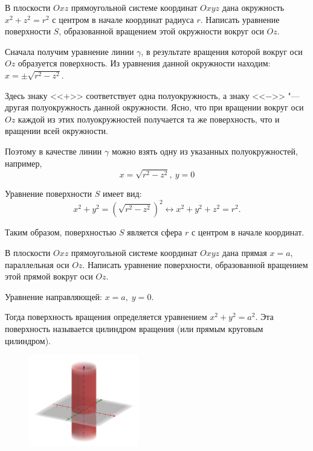 \begin{example}
  В плоскости $Oxz$ прямоугольной системе координат $Oxyz$ дана окружность $x^2 + z^2 = r^2$ с центром в начале координат радиуса $r$. Написать уравнение поверхности $S$, образованной вращением этой окружности вокруг оси $Oz$.

  Сначала получим уравнение линии $\gamma$, в результате вращения которой вокруг оси $Oz$ образуется поверхность. Из уравнения данной окружности находим: $x = \pm \sqrt{r^2 - z^2}$.

  Здесь знаку <<$+$>> соответствует одна полуокружность, а знаку <<$-$>> "--- другая полуокружность данной окружности. Ясно, что при вращении вокруг
  оси $Oz$ каждой из этих полуокружностей получается та же поверхность, что и вращении всей окружности.

  Поэтому в качестве линии $\gamma$ можно взять одну из указанных полуокружностей, например,
  $$
    x = \sqrt{r^2 - z^2},~ y = 0
  $$

  Уравнение поверхности $S$ имеет вид: $$
    x^2 + y^2 = (\sqrt{r^2 - z^2})^2 \leftrightarrow x^2 + y^2 + z^2 = r^2.
  $$

  Таким образом, поверхностью $S$ является сфера $r$ с центром в начале координат.
\end{example}

\begin{example}
  В плоскости $Oxz$ прямоугольной системе координат $Oxyz$ дана прямая $x = a$, параллельная оси $Oz$. Написать уравнение поверхности,
  образованной вращением этой прямой вокруг оси $Oz$.
  
  Уравнение направляющей: $x = a, \; y = 0$.

  Тогда поверхность вращения определяется уравнением $x^2 + y^2 = a^2$.
  Эта поверхность называется цилиндром вращения (или прямым круговым цилиндром).
  \begin{figure}[H]
    \centering
    \includegraphics[height = 4cm]{images/second_сylinder.png}
  \end{figure}
\end{example}

